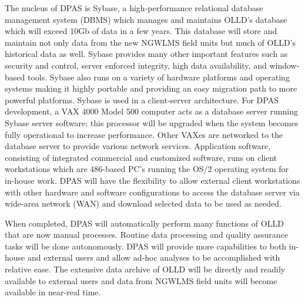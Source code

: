 	The nucleus of DPAS is Sybase, a high-performance relational 
database management system (DBMS) which manages and maintains OLLD's 
database which will exceed 10Gb of data in a few years.  This database 
will store and maintain not only data from the new NGWLMS field units but 
much of OLLD's historical data as well.  Sybase provides many other 
important features such as security and control, server enforced 
integrity, high data availability, and window-based tools.  Sybase also 
runs on a variety of hardware platforms and operating systems making it 
highly portable and providing an easy migration path to more powerful 
platforms.  Sybase is used in a client-server architecture.  For DPAS 
development, a VAX 4000 Model 500 computer acts as a database server 
running Sybase server software; this processor will be upgraded when the 
system becomes fully operational to increase performance.  Other VAXes 
are networked to the database server to provide various network services.  
Application software, consisting of integrated commercial and 
customized software, runs on client workstations which are 486-based 
PC's running the OS/2 operating system for in-house work.  DPAS will 
have the flexibility to allow external client workstations with other 
hardware and software configurations to access the database server via 
wide-area network (WAN) and download selected data to be used as 
needed.

	When completed, DPAS will automatically perform many functions of 
OLLD that are now manual processes.  Routine data processing and quality 
assurance tasks will be done autonomously.  DPAS will provide more 
capabilities to both in-house and external users and allow ad-hoc analyses 
to be accomplished with relative ease.  The extensive data archive of OLLD 
will be directly and readily available to external users and data from 
NGWLMS field units will become available in near-real time.
\newpage

